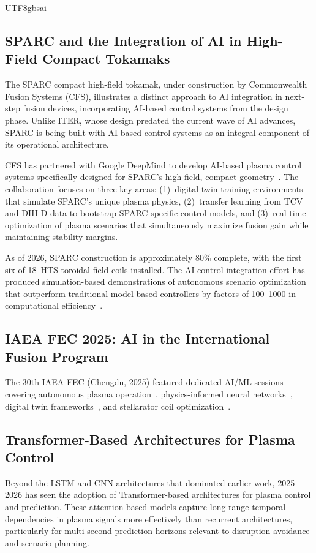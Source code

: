 \documentclass[12pt,a4paper]{article}
\begin{document}
\begin{CJK}{UTF8}{gbsai}
\subsection{SPARC and the Integration of AI in High-Field Compact Tokamaks}

The SPARC compact high-field tokamak, under construction by Commonwealth Fusion Systems (CFS), illustrates a distinct approach to AI integration in next-step fusion devices, incorporating AI-based control systems from the design phase. Unlike ITER, whose design predated the current wave of AI advances, SPARC is being built with AI-based control systems as an integral component of its operational architecture.

CFS has partnered with Google DeepMind to develop AI-based plasma control systems specifically designed for SPARC's high-field, compact geometry~\citep{CFS2025DeepMind}. The collaboration focuses on three key areas: (1)~digital twin training environments that simulate SPARC's unique plasma physics, (2)~transfer learning from TCV and DIII-D data to bootstrap SPARC-specific control models, and (3)~real-time optimization of plasma scenarios that simultaneously maximize fusion gain while maintaining stability margins.

As of 2026, SPARC construction is approximately 80\% complete, with the first six of 18~HTS toroidal field coils installed. The AI control integration effort has produced simulation-based demonstrations of autonomous scenario optimization that outperform traditional model-based controllers by factors of 100--1000 in computational efficiency~\citep{Rodriguez2025SPARC}.

\subsection{IAEA FEC 2025: AI in the International Fusion Program}

The 30th IAEA FEC (Chengdu, 2025) featured dedicated AI/ML sessions covering autonomous plasma operation~\citep{IAEA2025FEC}, physics-informed neural networks~\citep{Pau2025FEC}, digital twin frameworks~\citep{Siccinio2025FEC}, and stellarator coil optimization~\citep{Gates2025FEC}.

\subsection{Transformer-Based Architectures for Plasma Control}

Beyond the LSTM and CNN architectures that dominated earlier work, 2025--2026 has seen the adoption of Transformer-based architectures for plasma control and prediction. These attention-based models capture long-range temporal dependencies in plasma signals more effectively than recurrent architectures, particularly for multi-second prediction horizons relevant to disruption avoidance and scenario planning.


\end{CJK}
\end{document}
